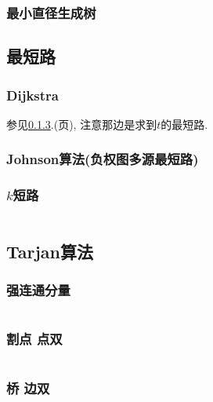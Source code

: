 \documentclass[a4paper, twoside]{article}
\begin{document}
\begin{multicols}{2}
				\subsubsection{最小直径生成树}
					
			
			\subsection{最短路}
				\subsubsection{Dijkstra}
					参见\ref{kshortestpath}.(\pageref{kshortestpath}页), 注意那边是求到$t$的最短路.
				
				\subsubsection{Johnson算法(负权图多源最短路)}
					
				


				\subsubsection{$k$短路}
					\label{kshortestpath}
					\inputminted{cpp}{../src/graph/k短路.cpp}
			
			\subsection{Tarjan算法}
				\subsubsection{强连通分量}
					\inputminted{cpp}{../src/graph/强连通分量.cpp}
				
				\subsubsection{割点 点双}
					\inputminted{cpp}{../src/graph/割点点双.cpp}

				\subsubsection{桥 边双}
					\inputminted{cpp}{../src/graph/边双.cpp}


\end{multicols}
\end{document}
